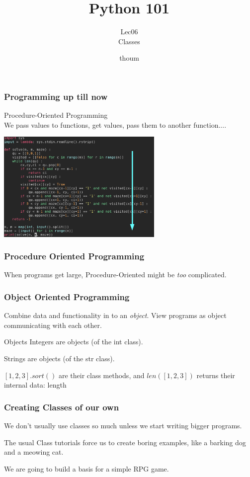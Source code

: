 \documentclass{beamer}
\title{Python 101}
\subtitle{Lec06 \\ Classes}
\author{thoum}
\begin{document}
\frame{\titlepage}

\begin{frame}
\frametitle{Programming up till now}
Procedure-Oriented Programming\\
We pass values to functions, get values, pass them to another function....
  \begin{center}
  \includegraphics[width=80mm]{./code.png}
  \end{center}
\end{frame}

\begin{frame}
\frametitle{Procedure Oriented Programming}
  When programs get large, Procedure-Oriented might be \textit{too}
  complicated.\\
\end{frame}

\begin{frame}
\frametitle{Object Oriented Programming}
  Combine data and functionality in to an \textit{object}.
  View programs as object communicating with each other.
\end{frame}

\begin{frame}{Objects}
  Integers are objects (of the int class).

  Strings are objects (of the str class).

  $[1,2,3].sort()$ are their class methods, and $len([1,2,3])$ returns their
  internal data: length
\end{frame}

\begin{frame}
\frametitle{Creating Classes of our own}
  We don't usually use classes so much unless we start writing bigger programs.

  The usual Class tutorials force us to create boring examples, like a barking
  dog and a meowing cat.

  We are going to build a basis for a simple RPG game.
\end{frame}
\end{document}
